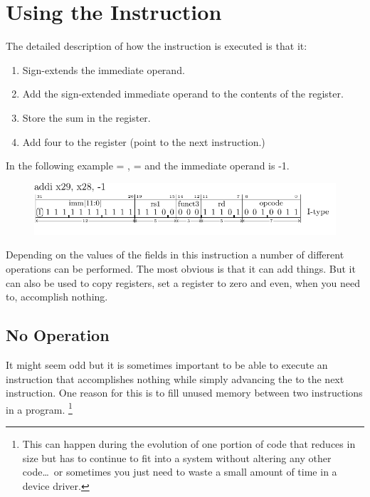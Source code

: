 \section{Using the  Instruction}
\label{uguide:addi}

%
The detailed description of how the  instruction is executed
is that it:

\begin{enumerate}
    \item Sign-extends the immediate operand.
    \item Add the sign-extended immediate operand to the contents of the  register.
    \item Store the sum in the  register.
    \item Add four to the  register (point to the next instruction.)
\end{enumerate}

In the following example  = ,  =  and
the immediate operand is -1.

\begin{figure}[H]
    \includegraphics{figures/chapter04/IType-addi_x29_x28_-1.pdf}
\end{figure}

Depending on the values of the fields in this instruction a number of
different operations can be performed.  The most obvious is that it
can add things.  But it can also be used to copy registers, set a
register to zero and even, when you need to, accomplish nothing.

\subsection{No Operation}

It might seem odd but it is sometimes important to be able to execute
an instruction that accomplishes nothing while simply advancing the
 to the next instruction.  One reason for this is to fill
unused memory between two instructions in a program.%
\footnote{This can happen during the evolution of one portion of code
that reduces in size but has to continue to fit into a system without
altering any other code\ldots\ or sometimes you just need to waste
a small amount of time in a device driver.}

